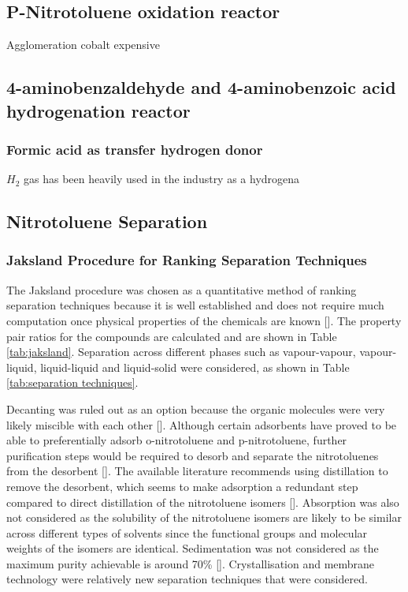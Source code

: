 \subsection{P-Nitrotoluene oxidation reactor}
Agglomeration
cobalt expensive

\subsection{4-aminobenzaldehyde and 4-aminobenzoic acid hydrogenation reactor}
\subsubsection{Formic acid as transfer hydrogen donor}
$H_2$ gas has been heavily used in the industry as a hydrogena

\subsection{Nitrotoluene Separation}
\subsubsection{Jaksland Procedure for Ranking Separation Techniques}
The Jaksland procedure was chosen as a quantitative method of ranking separation techniques because it is well established and does not require much computation once physical properties of the chemicals are known []. The property pair ratios for the compounds are calculated and are shown in Table \ref{tab:jaksland}. Separation across different phases such as vapour-vapour, vapour-liquid, liquid-liquid and liquid-solid were considered, as shown in Table \ref{tab:separation techniques}.

Decanting was ruled out as an option because the organic molecules were very likely miscible with each other []. Although certain adsorbents have proved to be able to preferentially adsorb o-nitrotoluene and p-nitrotoluene, further purification steps would be required to desorb and separate the nitrotoluenes from the desorbent []. The available literature recommends using distillation to remove the desorbent, which seems to make adsorption a redundant step compared to direct distillation of the nitrotoluene isomers []. Absorption was also not considered as the solubility of the nitrotoluene isomers are likely to be similar across different types of solvents since the functional groups and molecular weights of the isomers are identical. Sedimentation was not considered as the maximum purity achievable is around 70\% []. Crystallisation and membrane technology were relatively new separation techniques that were considered. 

